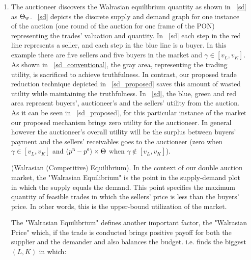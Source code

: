 \begin{enumerate}
\item The auctioneer discovers the Walrasian equilibrium quantity as shown in \figureautorefname~\ref{sd} as $\Theta_\textsc{w}$. \figureautorefname~\ref{sd} depicts the discrete supply and demand graph for one instance of the auction (one round of the auction for one frame of the PON) representing the trades' valuation and quantity. In \figureautorefname~\ref{sd} each step in the red line represents a seller, and each step in the blue line is a buyer. In this example there are five sellers and five buyers in the market and $\gamma \in [{v^{}_L} , {v^{}_K}]$. As shown in \figureautorefname~\ref{sd_conventional}, the gray area, representing the trading utility, is sacrificed to achieve truthfulness. In contrast, our proposed trade reduction technique depicted in \figureautorefname~\ref{sd_proposed} saves this amount of wasted utility while maintaining the truthfulness. In \figureautorefname~\ref{sd}, the blue, green and red area represent buyers', auctioneer's and the sellers' utility from the auction. As it can be seen in \figureautorefname~\ref{sd_proposed}, for this particular instance of the market our proposed mechanism brings zero utility for the auctioneer. In general however the auctioneer's overall utility will be the surplus between buyers' payment and the sellers' receivables goes to the auctioneer (zero when $\gamma \in [{v^{}_L} , {v^{}_K}]$ and $(p^\textsc{b} - p^\textsc{s}) \times \Theta$ when $\gamma \notin [{v^{}_L} , {v^{}_K}]$).




\begin{Definition}
(Walrasian (Competitive) Equilibrium).
In the context of our double auction market, the "Walrasian Equilibrium" is the point in the supply-demand plot in which the supply equals the demand. This point specifies the maximum quantity of feasible trades in which the sellers' price is less than the buyers' price. In other words, this is the upper-bound utilization of the market.
\end{Definition}

The "Walrasian Equilibrium" defines another important factor, the "Walrasian Price" which, if the trade is conducted brings positive payoff for both the supplier and the demander and also balances the budget. i.e. finds the biggest $(L, K)$ in which:


\end{enumerate}
